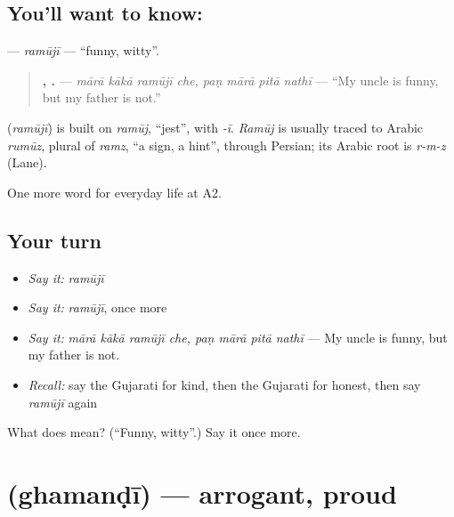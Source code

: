 \subsection*{You'll want to know: }
\textbf{} — \emph{ramūjī} — \textquotedblleft{}funny, witty\textquotedblright{}.

\begin{quote}
\textbf{   ,    .} — \emph{mārā kākā ramūjī che, paṇ mārā pitā nathī} — \textquotedblleft{}My uncle is funny, but my father is not.\textquotedblright{}
\end{quote}

\begin{cousinweb}
\textbf{} (\emph{ramūjī}) is built on \emph{ramūj}, \textquotedblleft{}jest\textquotedblright{}, with \emph{-ī}. \emph{Ramūj} is usually traced to Arabic \emph{rumūz}, plural of \emph{ramz}, \textquotedblleft{}a sign, a hint\textquotedblright{}, through Persian; its Arabic root is \emph{r-m-z} (Lane).
\end{cousinweb}

\begin{grammarlens}[title={What you've built}]
One more word for everyday life at A2.
\end{grammarlens}

\subsection*{Your turn}
\begin{itemize}
\raggedright
  \item \emph{Say it:} \emph{ramūjī}
  \item \emph{Say it:} \emph{ramūjī}, once more
  \item \emph{Say it:} \emph{mārā kākā ramūjī che, paṇ mārā pitā nathī} — My uncle is funny, but my father is not.
  \item \emph{Recall:} say the Gujarati for kind, then the Gujarati for honest, then say \emph{ramūjī} again
\end{itemize}

\begin{tcolorbox}[breakable,colback=teal!4,colframe=teal!35!black,title={Before you move on}]
What does  mean? (\textquotedblleft{}Funny, witty\textquotedblright{}.) Say it once more.
\end{tcolorbox}
\section[\texorpdfstring{\gu{ઘમંડી} (ghamanḍī)}{ઘમંડી (ghamanḍī)}]{ (ghamanḍī) — arrogant, proud}

